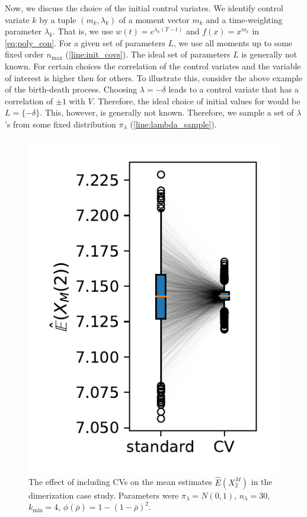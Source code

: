 Now, we discuss  the choice of the initial control  variates. We identify control  variate $k$ by
a tuple $({m}_k, \lambda_k)$ of a moment vector ${m}_k$
and a time-weighting
parameter $\lambda_k$.
That is, we use $w(t)=e^{\lambda_k(T-t)}$ and $f(x)=x^{m_k}$ in \eqref{eq:poly_con}.
For a given set of parameters $L$, we use all moments up to some fixed order $n_{\max}$ (\autoref{line:init_covs}).
The ideal set of parameters $L$ is generally not known. 
For certain choices the correlation of the control  variates and the variable of interest is
higher then for others.
To illustrate this, consider the above example of the birth-death process.
Choosing $\lambda=-\delta$ leads to a control variate that has a correlation of $\pm 1$ with
$V$. Therefore, the ideal
choice of initial values for would be $L=\{-\delta\}$.
This, however, is generally not known.
Therefore, we sample a set of $\lambda$'s
from some fixed distribution $\pi_{\lambda}$ (\autoref{line:lambda_sample}).
\begin{figure}[htb]
    \centering
    \includegraphics[scale=.6]{gfx/reduction.pdf}
	\caption[CV mean estimates v.\ std.\ mean estimates]{The effect of including \acp{CV} on the mean estimates $\hat{E}(X^M_2)$ in the dimerization case study. Parameters were ${\pi}_{\lambda}=N(0,1)$, ${n}_{\lambda}=30$, ${k}_{\min}=4$, $\phi(\bar\rho)=1-{(1 - \bar\rho)}^2$.}
\end{figure}


